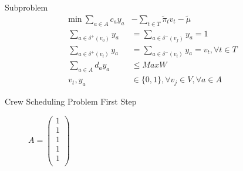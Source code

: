 \documentclass{beamer}
\begin{document}
\begin{frame}{Subproblem}
    \begin{subequations}
        \label{subp}
        \begin{align}
            \label{subp1} \text{min} \: \sum_{a \in A} c_a y_a &- \sum_{t \in T} \tilde{\pi}_t v_t - \tilde{\mu}\\
            \label{subp2} \sum_{a \in \delta^{+} (v_0)} y_{a} &= \sum_{a \in \delta^{-} (v_f)} y_{a} = 1 \\
            \label{subp3} \sum_{a \in \delta^{+} (v_t)} y_{a} &= \sum_{a \in \delta^{-} (v_t)} y_{a} = v_t, \forall t \in T \\
            \label{subp4} \sum_{a \in A} d_a y_{a} &\leq MaxW \\
            \label{subp5} v_t, y_a &\in \{0, 1\}, \forall v_j \in V, \forall a \in A
        \end{align}
    \end{subequations}
\end{frame}

\begin{frame}{Crew Scheduling Problem}
    First Step
    \begin{figure}[!htb]
            \centering
            $A = \begin{pmatrix}
                1 \\
                1 \\
                1 \\
                1 \\
                1 \\
            \end{pmatrix}$
    \end{figure}
\end{frame}
\end{document}
